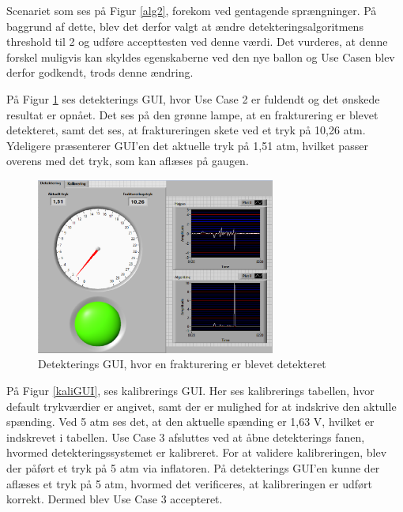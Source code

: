 Scenariet som ses på Figur \ref{alg2}, forekom ved gentagende sprængninger. På baggrund af dette, blev det derfor valgt at ændre detekteringsalgoritmens threshold til 2 og udføre accepttesten ved denne værdi. Det vurderes, at denne forskel muligvis kan skyldes egenskaberne ved den nye ballon og Use Casen blev derfor godkendt, trods denne ændring. 

På Figur \ref{detektering1} ses detekterings GUI, hvor Use Case 2 er fuldendt og det ønskede resultat er opnået. Det ses på den grønne lampe, at en frakturering er blevet detekteret, samt det ses, at fraktureringen skete ved et tryk på 10,26 atm. Ydeligere præsenterer GUI'en det aktuelle tryk på 1,51 atm, hvilket passer overens med det tryk, som kan aflæses på gaugen. 

\begin{figure}[H]
	\centering
	\includegraphics[width=0.7\textwidth]{Figure/detekteirng}
	\caption{Detekterings GUI, hvor en frakturering er blevet detekteret}
    \label{detektering1}
\end{figure}

På Figur \ref{kaliGUI}, ses kalibrerings GUI. Her ses kalibrerings tabellen, hvor default trykværdier er angivet, samt der er mulighed for at indskrive den aktulle spænding. Ved 5 atm ses det, at den aktuelle spænding er 1,63 V, hvilket er indskrevet i tabellen. Use Case 3 afsluttes ved at åbne detekterings fanen, hvormed detekteringssystemet er kalibreret. For at validere kalibreringen, blev der påført et tryk på 5 atm via inflatoren. På detekterings GUI'en kunne der aflæses et tryk på 5 atm, hvormed det verificeres, at kalibreringen er udført korrekt. Dermed blev Use Case 3 accepteret.  

